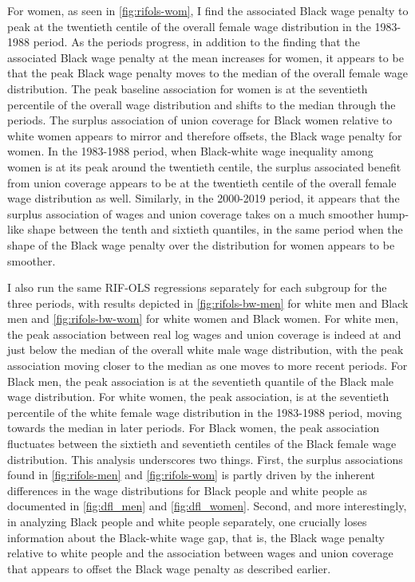 \documentclass[11pt]{article}
\begin{document}
For women, as seen in \autoref{fig:rifols-wom}, I find the associated Black wage penalty to peak at the twentieth centile of the overall female wage distribution in the 1983-1988 period. As the periods progress, in addition to the finding that the associated Black wage penalty at the mean increases for women, it appears to be that the peak Black wage penalty moves to the median of the overall female wage distribution. The peak baseline association for women is at the seventieth percentile of the overall wage distribution and shifts to the median through the periods. The surplus association of union coverage for Black women relative to white women appears to mirror and therefore offsets, the Black wage penalty for women. In the 1983-1988 period, when Black-white wage inequality among women is at its peak around the twentieth centile, the surplus associated benefit from union coverage appears to be at the twentieth centile of the overall female wage distribution as well. Similarly, in the 2000-2019 period, it appears that the surplus association of wages and union coverage takes on a much smoother hump-like shape between the tenth and sixtieth quantiles, in the same period when the shape of the Black wage penalty over the distribution for women appears to be smoother. 

I also run the same RIF-OLS regressions separately for each subgroup for the three periods, with results depicted in \autoref{fig:rifols-bw-men} for white men and Black men and \autoref{fig:rifols-bw-wom} for white women and Black women. For white men, the peak association between real log wages and union coverage is indeed at and just below the median of the overall white male wage distribution, with the peak association moving closer to the median as one moves to more recent periods. For Black men, the peak association is at the seventieth quantile of the Black male wage distribution. For white women, the peak association, is at the seventieth percentile of the white female wage distribution in the 1983-1988 period, moving towards the median in later periods. For Black women, the peak association fluctuates between the sixtieth and seventieth centiles of the Black female wage distribution. This analysis underscores two things. First, the surplus associations found in \autoref{fig:rifols-men} and \autoref{fig:rifols-wom} is partly driven by the inherent differences in the wage distributions for Black people and white people as documented in \autoref{fig:dfl_men} and \autoref{fig:dfl_women}. Second, and more interestingly, in analyzing Black people and white people separately, one crucially loses information about the Black-white wage gap, that is, the Black wage penalty relative to white people and the association between wages and union coverage that appears to offset the Black wage penalty as described earlier. 
\end{document}
